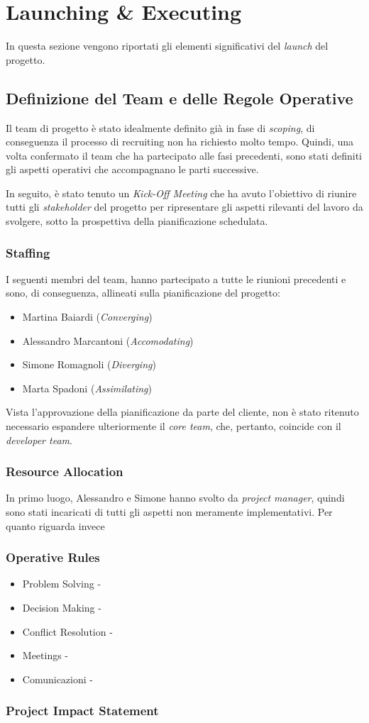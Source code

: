 \section{Launching \& Executing}
\label{sec:launching}

In questa sezione vengono riportati gli elementi significativi del \textit{launch} del progetto.

\subsection{Definizione del Team e delle Regole Operative}

Il team di progetto è stato idealmente definito già in fase di \textit{scoping}, di conseguenza il processo di recruiting non ha richiesto molto tempo. Quindi, una volta confermato il team che ha partecipato alle fasi precedenti, sono stati definiti gli aspetti operativi che accompagnano le parti successive.

In seguito, è stato tenuto un \textit{Kick-Off Meeting} che ha avuto l'obiettivo di riunire tutti gli \textit{stakeholder} del progetto per ripresentare gli aspetti rilevanti del lavoro da svolgere, sotto la prospettiva della pianificazione schedulata.

\subsubsection{Staffing}
I seguenti membri del team, hanno partecipato a tutte le riunioni precedenti e sono, di conseguenza, allineati sulla pianificazione del progetto:
\begin{itemize}
    \item Martina Baiardi (\textit{Converging})
    \item Alessandro Marcantoni (\textit{Accomodating})
    \item Simone Romagnoli (\textit{Diverging})
    \item Marta Spadoni (\textit{Assimilating})
\end{itemize}
Vista l'approvazione della pianificazione da parte del cliente, non è stato ritenuto necessario espandere ulteriormente il \textit{core team}, che, pertanto, coincide con il \textit{developer team}.

\subsubsection{Resource Allocation}
In primo luogo, Alessandro e Simone hanno svolto da \textit{project manager}, quindi sono stati incaricati di tutti gli aspetti non meramente implementativi.
Per quanto riguarda invece

\subsubsection{Operative Rules}
\begin{itemize}
    \item Problem Solving -
    \item Decision Making -
    \item Conflict Resolution -
    \item Meetings -
    \item Comunicazioni -
\end{itemize}

\subsubsection{Project Impact Statement}


